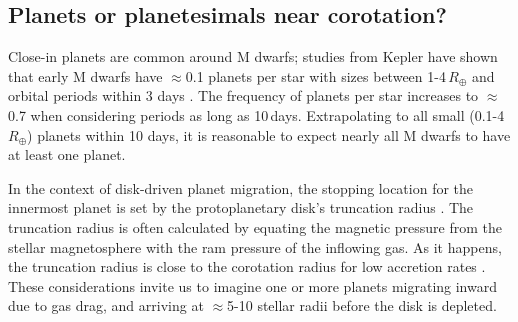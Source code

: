 \documentclass[11pt,twocolumn,tighten]{aastex63}
\begin{document}



\subsection{Planets or planetesimals near corotation?}

Close-in planets are common around M dwarfs; studies from Kepler have
shown that early M dwarfs have $\approx$0.1 planets per star with
sizes between 1-4\,$R_\oplus$ and orbital periods within 3 days
\citep{2015ApJ...807...45D}.  The frequency of planets per star
increases to $\approx$0.7 when considering periods as long as
10\,days.  Extrapolating to all small (0.1-4\,$R_\oplus$) planets
within 10 days, it is reasonable to expect nearly all M dwarfs to have
at least one planet.

In the context of disk-driven planet migration, the stopping location
for the innermost planet is set by the protoplanetary disk's
truncation radius \citep[e.g.][and references
therein]{2018haex.bookE.142I}.  The truncation radius is often
calculated by equating the magnetic pressure from the stellar
magnetosphere with the ram pressure of the inflowing gas.  As it
happens, the truncation radius is close to the corotation radius for
low accretion rates
\citep[e.g.][]{2015SSRv..191..339R,2022MNRAS.510.5246L}.  These
considerations invite us to imagine one or more planets migrating
inward due to gas drag, and arriving at $\approx$5-10 stellar radii
before the disk is depleted.
\end{document}
